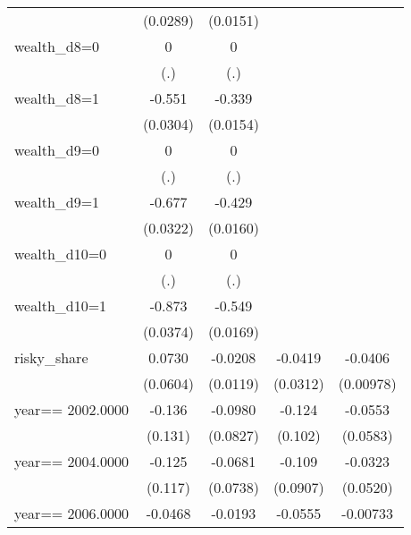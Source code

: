 \begin{table}[htbp]
\begin{tabular}{l*{4}{c}}
                & (0.0289)         & (0.0151)         &                  &                  \\
wealth\_d8=0     &        0         &        0         &                  &                  \\
                &      (.)         &      (.)         &                  &                  \\
wealth\_d8=1     &   -0.551\sym{***}&   -0.339\sym{***}&                  &                  \\
                & (0.0304)         & (0.0154)         &                  &                  \\
wealth\_d9=0     &        0         &        0         &                  &                  \\
                &      (.)         &      (.)         &                  &                  \\
wealth\_d9=1     &   -0.677\sym{***}&   -0.429\sym{***}&                  &                  \\
                & (0.0322)         & (0.0160)         &                  &                  \\
wealth\_d10=0    &        0         &        0         &                  &                  \\
                &      (.)         &      (.)         &                  &                  \\
wealth\_d10=1    &   -0.873\sym{***}&   -0.549\sym{***}&                  &                  \\
                & (0.0374)         & (0.0169)         &                  &                  \\
risky\_share     &   0.0730         &  -0.0208\sym{*}  &  -0.0419         &  -0.0406\sym{***}\\
                & (0.0604)         & (0.0119)         & (0.0312)         &(0.00978)         \\
year==  2002.0000&   -0.136         &  -0.0980         &   -0.124         &  -0.0553         \\
                &  (0.131)         & (0.0827)         &  (0.102)         & (0.0583)         \\
year==  2004.0000&   -0.125         &  -0.0681         &   -0.109         &  -0.0323         \\
                &  (0.117)         & (0.0738)         & (0.0907)         & (0.0520)         \\
year==  2006.0000&  -0.0468         &  -0.0193         &  -0.0555         & -0.00733         \\

\end{tabular}
\end{table}

